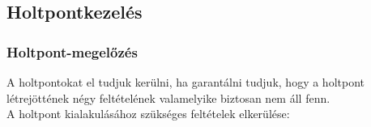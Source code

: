 \documentclass[tikz,12pt,margin=0px]{article}
\begin{document}
	\subsection*{Holtpontkezelés\\}

    \subsubsection*{Holtpont-megelőzés\\}

    A holtpontokat el tudjuk kerülni, ha garantálni tudjuk, hogy a holtpont létrejöttének négy feltételének valamelyike biztosan nem áll fenn.\\

    \noindent A holtpont kialakulásához szükséges feltételek elkerülése:
\end{document}
